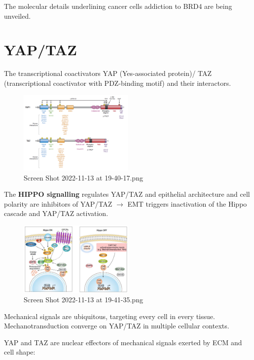 The molecular details underlining cancer cells addiction to BRD4 are being unveiled.

\hypertarget{yaptaz}{%
\section{YAP/TAZ}\label{yaptaz}}

The transcriptional coactivators YAP (Yes-associated protein)/ TAZ (transcriptional coactivator with PDZ-binding motif) and their interactors.

\begin{figure}
\centering
\includegraphics[width=0.5\textwidth]{../_resources/Screen_Shot_2022-11-13_at_19-40-17.png}
\caption{Screen Shot 2022-11-13 at 19-40-17.png}
\end{figure}

The \textbf{HIPPO signalling} regulates YAP/TAZ and epithelial architecture and cell polarity are inhibitors of YAP/TAZ $\rightarrow$ EMT triggers inactivation of the Hippo cascade and YAP/TAZ activation.

\begin{figure}
\centering
\includegraphics[width=0.5\textwidth]{../_resources/Screen_Shot_2022-11-13_at_19-41-35.png}
\caption{Screen Shot 2022-11-13 at 19-41-35.png}
\end{figure}

Mechanical signals are ubiquitous, targeting every cell in every tissue. Mechanotransduction converge on YAP/TAZ in multiple cellular contexts.

YAP and TAZ are nuclear effectors of mechanical signals exerted by ECM and cell shape:


